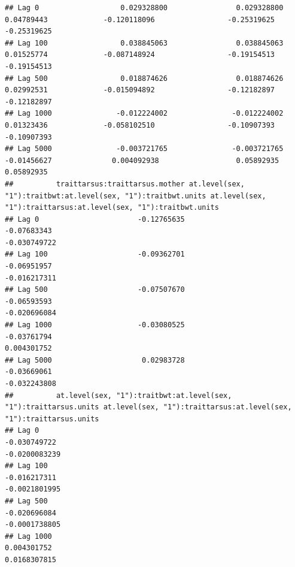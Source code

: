 \documentclass[
  12pt,
]{book}
\begin{document}
\begin{verbatim}
## Lag 0                   0.029328800                0.029328800                    0.04789443             -0.120118096                 -0.25319625                 -0.25319625
## Lag 100                 0.038845063                0.038845063                    0.01525774             -0.087148924                 -0.19154513                 -0.19154513
## Lag 500                 0.018874626                0.018874626                    0.02992531             -0.015094892                 -0.12182897                 -0.12182897
## Lag 1000               -0.012224002               -0.012224002                    0.01323436             -0.058102510                 -0.10907393                 -0.10907393
## Lag 5000               -0.003721765               -0.003721765                   -0.01456627              0.004092938                  0.05892935                  0.05892935
##          traittarsus:traittarsus.mother at.level(sex, "1"):traitbwt:at.level(sex, "1"):traitbwt.units at.level(sex, "1"):traittarsus:at.level(sex, "1"):traitbwt.units
## Lag 0                       -0.12765635                                                   -0.07683343                                                     -0.030749722
## Lag 100                     -0.09362701                                                   -0.06951957                                                     -0.016217311
## Lag 500                     -0.07507670                                                   -0.06593593                                                     -0.020696084
## Lag 1000                    -0.03080525                                                   -0.03761794                                                      0.004301752
## Lag 5000                     0.02983728                                                   -0.03669061                                                     -0.032243808
##          at.level(sex, "1"):traitbwt:at.level(sex, "1"):traittarsus.units at.level(sex, "1"):traittarsus:at.level(sex, "1"):traittarsus.units
## Lag 0                                                        -0.030749722                                                       -0.0200083239
## Lag 100                                                      -0.016217311                                                       -0.0021801995
## Lag 500                                                      -0.020696084                                                       -0.0001738805
## Lag 1000                                                      0.004301752                                                        0.0168307815

\end{verbatim}
\end{document}

